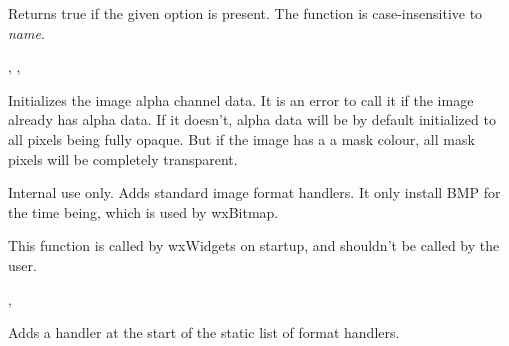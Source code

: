 
Returns true if the given option is present. The function is case-insensitive to {\it name}.


,\rtfsp
{},\rtfsp
{}


\label{wximageinitalpha}


Initializes the image alpha channel data. It is an error to call it
if the image already has alpha data. If it doesn't, alpha data will be
by default initialized to all pixels being fully opaque. But if the image has a
a mask colour, all mask pixels will be completely transparent.


\label{wximageinitstandardhandlers}


Internal use only. Adds standard image format handlers. It only install BMP
for the time being, which is used by wxBitmap.

This function is called by wxWidgets on startup, and shouldn't be called by
the user.


, 


\label{wximageinserthandler}


Adds a handler at the start of the static list of format handlers.





\label{wximageistransparent}


